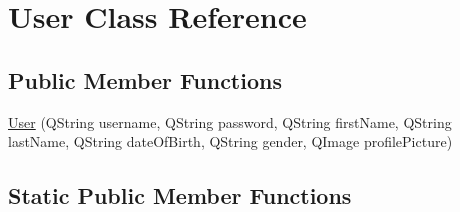 \hypertarget{classUser}{\section{User Class Reference}
\label{classUser}
}
\subsection*{Public Member Functions}
\begin{DoxyCompactItemize}
\item 
\hyperlink{classUser_a49af102252f983aa3d85bd59193c9bf1}{User} (Q\-String username, Q\-String password, Q\-String first\-Name, Q\-String last\-Name, Q\-String date\-Of\-Birth, Q\-String gender, Q\-Image profile\-Picture)
\end{DoxyCompactItemize}
\subsection*{Static Public Member Functions}
